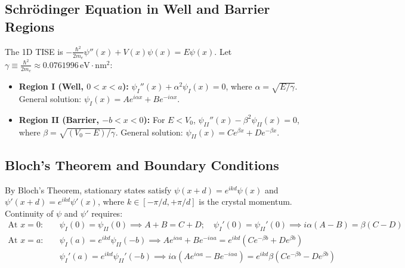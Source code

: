 \documentclass[10pt, a4paper]{article}
\begin{document}
\subsection{Schrödinger Equation in Well and Barrier Regions}
The 1D TISE is $-\frac{\hbar^2}{2m_e}\psi''(x) + V(x)\psi(x) = E\psi(x)$. Let $\gamma \equiv \frac{\hbar^2}{2m_e} \approx 0.0761996\,\text{eV}\cdot\text{nm}^2$:
\begin{itemize}\setlength{\itemsep}{0pt}\setlength{\parskip}{0.5pt}
    \item \textbf{Region I (Well, $0 < x < a$):} $\psi_I''(x) + \alpha^2\psi_I(x) = 0$, where $\alpha = \sqrt{E/\gamma}$. General solution: $\psi_I(x) = A e^{i\alpha x} + B e^{-i\alpha x}$.
    \item \textbf{Region II (Barrier, $-b < x < 0$):} For $E < V_0$, $\psi_{II}''(x) - \beta^2\psi_{II}(x) = 0$, where $\beta = \sqrt{(V_0 - E)/\gamma}$. General solution: $\psi_{II}(x) = C e^{\beta x} + D e^{-\beta x}$.
\end{itemize}

\subsection{Bloch's Theorem and Boundary Conditions}
By Bloch's Theorem, stationary states satisfy $\psi(x+d) = e^{ikd}\psi(x)$ and $\psi'(x+d) = e^{ikd}\psi'(x)$, where $k \in [-\pi/d, +\pi/d]$ is the crystal momentum. Continuity of $\psi$ and $\psi'$ requires:
\begin{align}
\text{At } x = 0: \quad &\psi_I(0) = \psi_{II}(0) \implies A + B = C + D; \quad \psi_I'(0) = \psi_{II}'(0) \implies i\alpha(A - B) = \beta(C - D) \label{eq:bc12}\\
\text{At } x = a: \quad &\psi_I(a) = e^{ikd}\psi_{II}(-b) \implies A e^{i\alpha a} + B e^{-i\alpha a} = e^{ikd}(C e^{-\beta b} + D e^{\beta b}) \label{eq:bc3}\\
&\psi_I'(a) = e^{ikd}\psi_{II}'(-b) \implies i\alpha(A e^{i\alpha a} - B e^{-i\alpha a}) = e^{ikd}\beta(C e^{-\beta b} - D e^{\beta b}) \label{eq:bc4}
\end{align}
\end{document}

